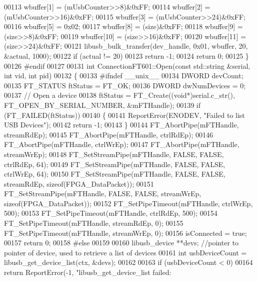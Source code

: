 \begin{DoxyCode}
00113     wbuffer[1] = (mUsbCounter>>8)&0xFF;
00114     wbuffer[2] = (mUsbCounter>>16)&0xFF;
00115     wbuffer[3] = (mUsbCounter>>24)&0xFF;
00116     wbuffer[5] = 0x02;
00117     wbuffer[8] = (size)&0xFF;
00118     wbuffer[9] = (size>>8)&0xFF;
00119     wbuffer[10] = (size>>16)&0xFF;
00120     wbuffer[11] = (size>>24)&0xFF;
00121     libusb\_bulk\_transfer(dev\_handle, 0x01, wbuffer, 20, &actual, 1000);
00122     \textcolor{keywordflow}{if} (actual != 20)
00123         \textcolor{keywordflow}{return} -1;
00124     \textcolor{keywordflow}{return} 0;
00125 \}
00126 \textcolor{preprocessor}{#endif}
00127 
00131 \textcolor{keywordtype}{int} ConnectionFT601::Open(\textcolor{keyword}{const} std::string &serial, \textcolor{keywordtype}{int} vid, \textcolor{keywordtype}{int} pid)
00132 \{
00133 \textcolor{preprocessor}{#ifndef \_\_unix\_\_}
00134     DWORD devCount;
00135     FT_STATUS ftStatus = FT_OK;
00136     DWORD dwNumDevices = 0;
00137     \textcolor{comment}{// Open a device}
00138     ftStatus = FT\_Create((\textcolor{keywordtype}{void}*)serial.c\_str(), FT_OPEN_BY_SERIAL_NUMBER, &mFTHandle);
00139     \textcolor{keywordflow}{if} (FT_FAILED(ftStatus))
00140     \{
00141         ReportError(ENODEV, \textcolor{stringliteral}{"Failed to list USB Devices"});
00142         \textcolor{keywordflow}{return} -1;
00143     \}
00144     FT\_AbortPipe(mFTHandle, streamRdEp);
00145     FT\_AbortPipe(mFTHandle, ctrlRdEp);
00146     FT\_AbortPipe(mFTHandle, ctrlWrEp);
00147     FT\_AbortPipe(mFTHandle, streamWrEp);
00148     FT\_SetStreamPipe(mFTHandle, FALSE, FALSE, ctrlRdEp, 64);
00149     FT\_SetStreamPipe(mFTHandle, FALSE, FALSE, ctrlWrEp, 64);
00150     FT\_SetStreamPipe(mFTHandle, FALSE, FALSE, streamRdEp, \textcolor{keyword}{sizeof}(FPGA_DataPacket));
00151     FT\_SetStreamPipe(mFTHandle, FALSE, FALSE, streamWrEp, \textcolor{keyword}{sizeof}(FPGA_DataPacket));
00152     FT\_SetPipeTimeout(mFTHandle, ctrlWrEp, 500);
00153     FT\_SetPipeTimeout(mFTHandle, ctrlRdEp, 500);
00154     FT\_SetPipeTimeout(mFTHandle, streamRdEp, 0);
00155     FT\_SetPipeTimeout(mFTHandle, streamWrEp, 0);
00156     isConnected = \textcolor{keyword}{true};
00157     \textcolor{keywordflow}{return} 0;
00158 \textcolor{preprocessor}{#else}
00159 
00160     libusb\_device **devs; \textcolor{comment}{//pointer to pointer of device, used to retrieve a list of devices}
00161     \textcolor{keywordtype}{int} usbDeviceCount = libusb\_get\_device\_list(ctx, &devs);
00162 
00163     \textcolor{keywordflow}{if} (usbDeviceCount < 0)
00164         \textcolor{keywordflow}{return} ReportError(-1, \textcolor{stringliteral}{"libusb\_get\_device\_list failed: %
}
\end{DoxyCode}
